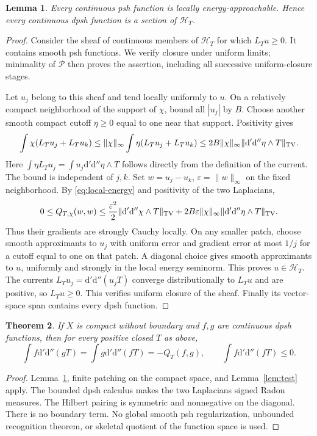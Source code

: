\documentclass[11pt]{article}
\newtheorem{theorem}{Theorem}
\newtheorem{lemma}[theorem]{Lemma}
\newcommand{\dd}{\mathrm d'\mathrm d''}
\begin{document}
\begin{lemma}\label{lem:psh}
Every continuous psh function is locally energy-approachable. Hence
every continuous dpsh function is a section of $\mathscr H_T$.
\end{lemma}
\begin{proof}
Consider the sheaf of continuous members of $\mathscr H_T$ for which
$L_Tu\geq0$. It contains smooth psh functions. We verify closure under
uniform limits; minimality of $\mathscr P$ then proves the assertion,
including all successive uniform-closure stages.

Let $u_j$ belong to this sheaf and tend locally uniformly to $u$.
On a relatively compact neighborhood of the support of $\chi$, bound
all $|u_j|$ by $B$. Choose another smooth compact cutoff $\eta\geq0$
equal to one near that support. Positivity gives
\[
 \int\chi(L_Tu_j+L_Tu_k)
   \leq\|\chi\|_\infty\int\eta(L_Tu_j+L_Tu_k)
   \leq2B\|\chi\|_\infty\|\dd\eta\wedge T\|_{\rm TV}.
\]
Here $\int\eta L_Tu_j=\int u_j\dd\eta\wedge T$ follows directly
from the definition of the current. The bound is independent of $j,k$.
Set $w=u_j-u_k$, $\varepsilon=\|w\|_\infty$ on the fixed neighborhood.
By \eqref{eq:local-energy} and positivity of the two Laplacians,
\[
 0\leq Q_{T,\chi}(w,w)
  \leq\frac{\varepsilon^2}{2}\|\dd\chi\wedge T\|_{\rm TV}
       +2B\varepsilon\|\chi\|_\infty\|\dd\eta\wedge T\|_{\rm TV}.
\]
Thus their gradients are strongly Cauchy locally. On any smaller patch,
choose smooth approximants to $u_j$ with uniform error and gradient
error at most $1/j$ for a cutoff equal to one on that patch. A diagonal
choice gives smooth approximants to $u$, uniformly and strongly in the
local energy seminorm. This proves $u\in\mathscr H_T$. The currents
$L_Tu_j=\dd(u_jT)$ converge distributionally to $L_Tu$ and are
positive, so $L_Tu\geq0$. This verifies uniform closure of the sheaf.
Finally its vector-space span contains every dpsh function.
\end{proof}

\begin{theorem}\label{thm:green}
If $X$ is compact without boundary and $f,g$ are continuous dpsh
functions, then for every positive closed $T$ as above,
\[
 \int f\dd(gT)=\int g\dd(fT)=-Q_T(f,g),\qquad
                  \int f\dd(fT)\leq0.
\]
\end{theorem}
\begin{proof}
Lemma~\ref{lem:psh}, finite patching on the compact space, and
Lemma~\ref{lem:test} apply. The bounded dpsh calculus makes the two
Laplacians signed Radon measures. The Hilbert pairing is symmetric and
nonnegative on the diagonal. There is no boundary term. No global
smooth psh regularization, unbounded recognition theorem, or skeletal
quotient of the function space is used.
\end{proof}
\end{document}
